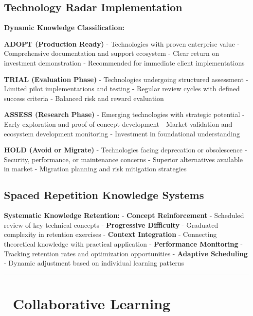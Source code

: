 \documentclass[
  letterpaper,
  DIV=11,
  numbers=noendperiod]{scrartcl}
\begin{document}
\subsection{Technology Radar
Implementation}\label{technology-radar-implementation}

\textbf{Dynamic Knowledge Classification:}

\textbf{ADOPT (Production Ready)} - Technologies with proven enterprise
value - Comprehensive documentation and support ecosystem - Clear return
on investment demonstration - Recommended for immediate client
implementations

\textbf{TRIAL (Evaluation Phase)} - Technologies undergoing structured
assessment - Limited pilot implementations and testing - Regular review
cycles with defined success criteria - Balanced risk and reward
evaluation

\textbf{ASSESS (Research Phase)} - Emerging technologies with strategic
potential - Early exploration and proof-of-concept development - Market
validation and ecosystem development monitoring - Investment in
foundational understanding

\textbf{HOLD (Avoid or Migrate)} - Technologies facing deprecation or
obsolescence - Security, performance, or maintenance concerns - Superior
alternatives available in market - Migration planning and risk
mitigation strategies

\subsection{Spaced Repetition Knowledge
Systems}\label{spaced-repetition-knowledge-systems}

\textbf{Systematic Knowledge Retention:} - \textbf{Concept
Reinforcement} - Scheduled review of key technical concepts -
\textbf{Progressive Difficulty} - Graduated complexity in retention
exercises - \textbf{Context Integration} - Connecting theoretical
knowledge with practical application - \textbf{Performance Monitoring} -
Tracking retention rates and optimization opportunities -
\textbf{Adaptive Scheduling} - Dynamic adjustment based on individual
learning patterns

\begin{center}\rule{0.5\linewidth}{0.5pt}\end{center}

\section{🤝 Collaborative Learning}\label{collaborative-learning}
\end{document}
